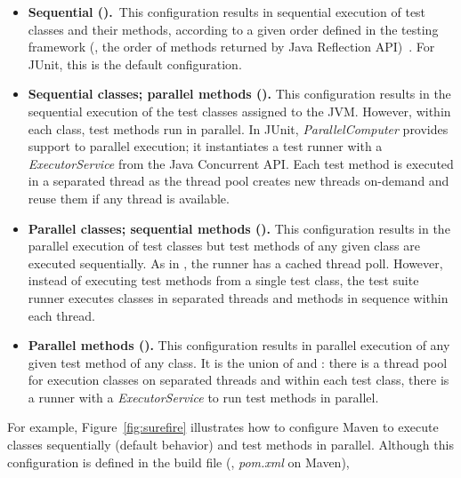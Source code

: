 \begin{itemize}
\item \textbf{Sequential (\Seq).}~This configuration results in
    sequential execution of test classes and their methods, according
    to a given order defined in the testing framework (\eg, the order
    of methods returned by Java Reflection
    API)~\cite{junit-test-order}. For JUnit, this is the default
    configuration.

\item \textbf{Sequential classes; parallel methods
  (\ParClassSeqMeth{}).} This configuration results in the sequential
  execution of the test classes assigned to the JVM.  However, within
  each class, test methods run in parallel. In JUnit,
  \emph{ParallelComputer} provides support to parallel execution; it
  instantiates a test runner with a \emph{ExecutorService} from the
  Java Concurrent API. Each test method is executed in a separated
  thread as the thread pool creates new threads on-demand and reuse
  them if any thread is available.


\item \textbf{Parallel classes; sequential methods
  (\SeqClassParMeth{}).}  This configuration results in the parallel
  execution of test classes but test methods of any given class are
  executed sequentially. As in \ParClassSeqMeth, the runner has a
  cached thread poll. However, instead of executing test methods from
  a single test class, the test suite runner executes classes in
  separated threads and methods in sequence within each thread.

\item \textbf{Parallel methods (\ParClassParMeth).} This configuration
  results in parallel execution of any given test method of any class.
  It is the union of \ParClassSeqMeth and \SeqClassParMeth: there is a
  thread pool for execution classes on separated threads and within
  each test class, there is a runner with a \emph{ExecutorService} to
  run test methods in parallel.
\end{itemize}

 For example, Figure~\ref{fig:surefire} illustrates how to
configure Maven to execute classes sequentially (default behavior) and
test methods in parallel. Although this configuration is defined in
the build file (\eg, \emph{pom.xml} on Maven), 

